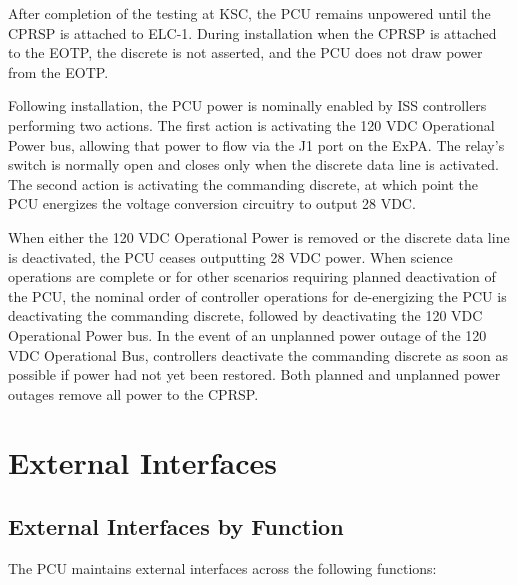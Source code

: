 \documentclass[12pt,oneside,oldfontcommands]{memoir}
\begin{document}
After completion of the testing at \gls{KSC}, the \gls{PCU} remains unpowered until the \gls{CPRSP} is attached to \gls{ELC}-1. During installation when the \gls{CPRSP} is attached to the \gls{EOTP}, the discrete is not asserted, and the \gls{PCU} does not draw power from the \gls{EOTP}.

Following installation, the \gls{PCU} power is nominally enabled by \gls{ISS} controllers performing two actions. The first action is activating the 120 \gls{VDC} Operational Power bus, allowing that power to flow via the J1 port on the \gls{ExPA}. The relay's switch is normally open and closes only when the discrete data line is activated. The second action is activating the commanding discrete, at which point the \gls{PCU} energizes the voltage conversion circuitry to output 28 \gls{VDC}.

When either the 120 \gls{VDC} Operational Power is removed or the discrete data line is deactivated, the \gls{PCU} ceases outputting 28 \gls{VDC} power. When science operations are complete or for other scenarios requiring planned deactivation of the \gls{PCU}, the nominal order of controller operations for de-energizing the \gls{PCU} is deactivating the commanding discrete, followed by deactivating the 120 \gls{VDC} Operational Power bus. In the event of an unplanned power outage of the 120 \gls{VDC} Operational Bus, controllers deactivate the commanding discrete as soon as possible if power had not yet been restored. Both planned and unplanned power outages remove all power to the \gls{CPRSP}.

\chapter{External Interfaces  }
\label{interfaces}

\section{External Interfaces by Function}
\label{externalinterfacesbyfunction}

The \gls{PCU} maintains external interfaces across the following functions:
\end{document}
